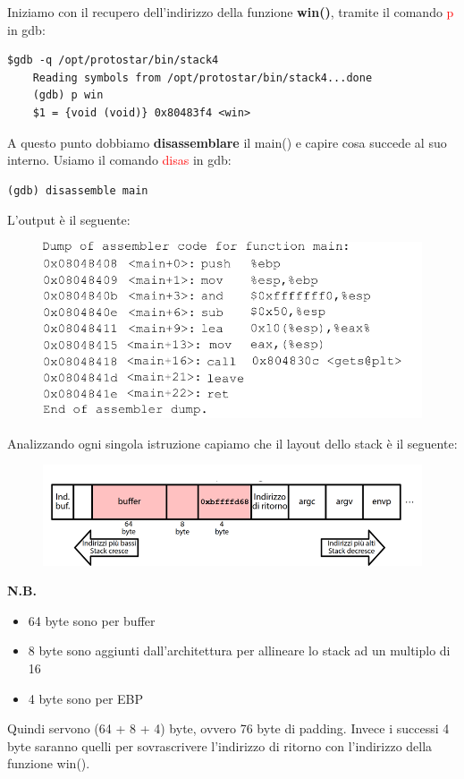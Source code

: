 Iniziamo con il recupero dell'indirizzo della funzione \textbf{win()}, tramite il comando \textcolor{red}{p} in gdb:
\begin{lstlisting}[style=bashstyle]
    $gdb -q /opt/protostar/bin/stack4
    Reading symbols from /opt/protostar/bin/stack4...done
    (gdb) p win 
    $1 = {void (void)} 0x80483f4 <win>
\end{lstlisting}

A questo punto dobbiamo \textbf{disassemblare} il main() e capire cosa succede al suo interno. Usiamo il comando \textcolor{red}{disas} in gdb:
\begin{lstlisting}[style=bashstyle]
    (gdb) disassemble main
\end{lstlisting}
L'output è il seguente:
\begin{figure}[h]
    \includegraphics[width=\textwidth]{Capitolo 3/Figure/disas-main-stack4.png}
\end{figure}

Analizzando ogni singola istruzione capiamo che il layout dello stack è il seguente:
\begin{figure}[h]
    \includegraphics[width=\textwidth]{Capitolo 3/Figure/layout-stack4.png}
\end{figure}
\clearpage
\textbf{N.B.}\begin{itemize}
    \item 64 byte sono per buffer
    \item 8 byte sono aggiunti dall'architettura per allineare lo stack ad un multiplo di 16
    \item 4 byte sono per EBP
\end{itemize}
Quindi servono (64 + 8 + 4) byte, ovvero 76 byte di padding. Invece i successi 4 byte saranno quelli per sovrascrivere l'indirizzo di ritorno con l'indirizzo della funzione win().

